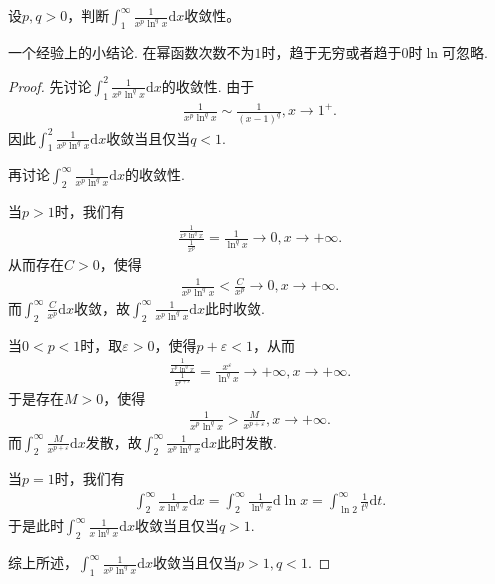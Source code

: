\documentclass[../../main.tex]{subfiles}
\begin{document}
\begin{example}
设\(p,q > 0\)，判断\(\int_{1}^{\infty}\frac{1}{x^p\ln^q x}\mathrm{d}x\)收敛性。 
\end{example}
\begin{note}
一个经验上的小结论. 在幂函数次数不为\(1\)时，趋于无穷或者趋于\(0\)时\(\ln\)可忽略.
\end{note}
\begin{proof}
先讨论\(\int_{1}^{2}\frac{1}{x^p\ln ^q x}\mathrm{d}x\)的收敛性. 由于
\begin{align*}
\frac{1}{x^p\ln ^q x}\sim\frac{1}{(x - 1)^q},x\rightarrow 1^+.
\end{align*}
因此\(\int_{1}^{2}\frac{1}{x^p\ln ^q x}\mathrm{d}x\)收敛当且仅当\(q < 1\).

再讨论\(\int_{2}^{\infty}\frac{1}{x^p\ln ^q x}\mathrm{d}x\)的收敛性.

\one 当\(p > 1\)时，我们有
\begin{align*}
\frac{\frac{1}{x^p\ln ^q x}}{\frac{1}{x^p}}=\frac{1}{\ln ^q x}\rightarrow 0,x\rightarrow +\infty.
\end{align*}
从而存在\(C > 0\)，使得
\begin{align*}
\frac{1}{x^p\ln ^q x}<\frac{C}{x^p}\rightarrow 0,x\rightarrow +\infty.
\end{align*}
而\(\int_{2}^{\infty}\frac{C}{x^p}\mathrm{d}x\)收敛，故\(\int_{2}^{\infty}\frac{1}{x^p\ln ^q x}\mathrm{d}x\)此时收敛.

\two 当\(0 < p < 1\)时，取\(\varepsilon > 0\)，使得\(p + \varepsilon < 1\)，从而
\begin{align*}
\frac{\frac{1}{x^p\ln ^q x}}{\frac{1}{x^{p + \varepsilon}}}=\frac{x^{\varepsilon}}{\ln ^q x}\rightarrow +\infty,x\rightarrow +\infty.
\end{align*}
于是存在\(M > 0\)，使得
\begin{align*}
\frac{1}{x^p\ln ^q x}>\frac{M}{x^{p + \varepsilon}},x\rightarrow +\infty.
\end{align*}
而\(\int_{2}^{\infty}\frac{M}{x^{p + \varepsilon}}\mathrm{d}x\)发散，故\(\int_{2}^{\infty}\frac{1}{x^p\ln ^q x}\mathrm{d}x\)此时发散.

\three 当\(p = 1\)时，我们有
\begin{align*}
\int_{2}^{\infty}\frac{1}{x\ln ^q x}\mathrm{d}x=\int_{2}^{\infty}\frac{1}{\ln ^q x}\mathrm{d}\ln x=\int_{\ln 2}^{\infty}\frac{1}{t^q}\mathrm{d}t.
\end{align*}
于是此时\(\int_{2}^{\infty}\frac{1}{x\ln ^q x}\mathrm{d}x\)收敛当且仅当\(q > 1\).

综上所述，\(\int_{1}^{\infty}\frac{1}{x^p\ln ^q x}\mathrm{d}x\)收敛当且仅当\(p > 1,q < 1\). 

\end{proof}
\end{document}
